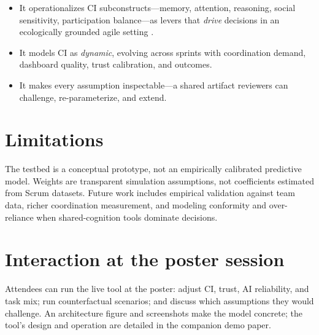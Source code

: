 \documentclass{article}
\begin{document}
\begin{itemize}
    \item It operationalizes CI subconstructs---memory, attention, reasoning, social sensitivity, participation balance---as levers that \emph{drive} decisions in an ecologically grounded agile setting \citep{Woolley2010,kommol2025structure}.
    \item It models CI as \emph{dynamic}, evolving across sprints with coordination demand, dashboard quality, trust calibration, and outcomes.
    \item It makes every assumption inspectable---a shared artifact reviewers can challenge, re-parameterize, and extend.
\end{itemize}

\section{Limitations}
\label{sec:limits}

The testbed is a conceptual prototype, not an empirically calibrated predictive model. Weights are transparent simulation assumptions, not coefficients estimated from Scrum datasets. Future work includes empirical validation against team data, richer coordination measurement, and modeling conformity and over-reliance when shared-cognition tools dominate decisions.

\section{Interaction at the poster session}

Attendees can run the live tool at the poster: adjust CI, trust, AI reliability, and task mix; run counterfactual scenarios; and discuss which assumptions they would challenge. An architecture figure and screenshots make the model concrete; the tool's design and operation are detailed in the companion demo paper.



\end{document}
